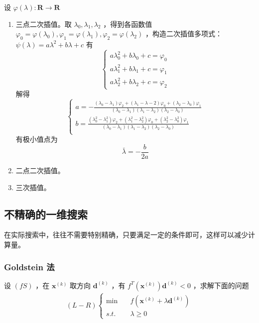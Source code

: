 \documentclass{book}
\begin{document}
设 $\varphi(\lambda):\mathbf{R}\rightarrow \mathbf{R}$
\begin{enumerate}
    \item 三点二次插值。取 $\lambda_0,\lambda_1,\lambda_2$ ，得到各函数值 $\varphi_0=\varphi(\lambda_0), \varphi_1=\varphi(\lambda_1),\varphi_2=\varphi(\lambda_2)$ ，构造二次插值多项式：$\psi (\lambda)=a\lambda^2+b\lambda+c$ 有
          $$\begin{cases}
                  a\lambda_0^2+b\lambda_0+c=\varphi_0 \\
                  a\lambda_1^2+b\lambda_1+c=\varphi_1 \\
                  a\lambda_2^2+b\lambda_2+c=\varphi_2
              \end{cases}$$
          解得
          $$\begin{cases}
                  a=-\frac{(\lambda_0-\lambda_1)\varphi_2+(\lambda_1-\lambda-2)\varphi_0+(\lambda_2-\lambda_0)\varphi_1}{(\lambda_0-\lambda_1)(\lambda_1-\lambda_2)(\lambda_2-\lambda_0)}            \\
                  b=\frac{(\lambda_0^2-\lambda_1^2)\varphi_2+(\lambda_1^2-\lambda_2^2)\varphi_0+(\lambda_2^2-\lambda_0^2)\varphi_1}{(\lambda_0-\lambda_1)(\lambda_1-\lambda_2)(\lambda_2-\lambda_0)} \\
              \end{cases}$$
          有极小值点为 $$\bar{\lambda}=-\frac{b}{2a}$$
    \item 二点二次插值。
    \item 三次插值。
\end{enumerate}

\subsection{不精确的一维搜索}

在实际搜索中，往往不需要特别精确，只要满足一定的条件即可，这样可以减少计算量。

\subsubsection{Goldstein 法}

设 $(fS)$ ，在 $\boldsymbol{x}^{(k)}$ 取方向 $\boldsymbol{d}^{(k)}$ ，有 $f^T(\boldsymbol{x}^{(k)})\boldsymbol{d}^{(k)}<0$ ，求解下面的问题
\begin{align*}
    (L-R)\begin{cases}
             \min\quad & f(\boldsymbol{x}^{(k)}+\lambda\boldsymbol{d}^{(k)}) \\
             s.t.\quad & \lambda\ge 0
         \end{cases}
\end{align*}
\end{document}

